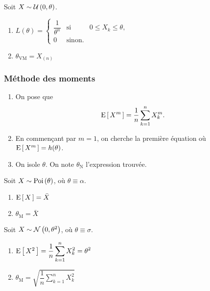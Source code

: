 \documentclass[11pt]{article}
\newcommand\Poi[1]{%
	\ensuremath{%
		\mathrm{Poi}\left(#1\right)%
	}%
}%
\newcommand\Uni[2]{%
	\ensuremath{%
		\mathcal{U}\left(#1,#2\right)%
	}%
}%
\newcommand\Norm[2]{%
	\ensuremath{%
		\mathcal{N}\left(#1,#2\right)%
	}%
}%
\newcommand\Esp[1]{%
	\ensuremath{%
		\mathrm{E}\left[\,#1\,\right]%
	}%
}%
\theoremstyle{remark}
\theoremstyle{definition}
\begin{document}
\begin{exemple}
	Soit $X\sim\Uni{0}{\theta}$.

	\begin{enumerate}
		\item $
			L(\theta)
			=\left\{
				\begin{matrix}
					\dfrac{1}{\theta^n} & \text{si} & 0\leq X_k\leq\theta,\\
					0                   & \text{sinon}.
				\end{matrix}
			\right.
		$

		\item $
			\theta_{\text{VM}}=X_{(n)}
		$
	\end{enumerate}
\end{exemple}

\subsubsection{Méthode des moments}
\begin{enumerate}
	\item On pose que
	\begin{equation*}
		\Esp{X^m}=\frac{1}{n}\sum_{k=1}^nX_k^m.
	\end{equation*}

	\item En commençant par $m=1$, on cherche la première équation où
	$\Esp{X^m}=h(\theta)$.

	\item On isole $\theta$. On note $\theta_{\text{N}}$ l'expression trouvée.
\end{enumerate}

\begin{exemple}
	Soit $X\sim\Poi{\theta}$, où $\theta\equiv\alpha$.

	\begin{enumerate}
		\item $
			\Esp{X}=\bar{X}
		$

		\item $
			\theta_{\text{M}}=\bar{X}
		$
	\end{enumerate}
\end{exemple}

\begin{exemple}
	Soit $X\sim\Norm{0}{\theta^2}$, où $\theta\equiv\sigma$.

	\begin{enumerate}
		\item $
			\Esp{X^2}
			=\dfrac{1}{n}\displaystyle\sum_{k=1}^nX_k^2
			=\theta^2
		$

		\item $
			\theta_{\text{M}}
			=\sqrt{\dfrac{1}{n}\displaystyle\sum_{k=1}^nX_k^2}
		$
	\end{enumerate}
\end{exemple}
\end{document}

